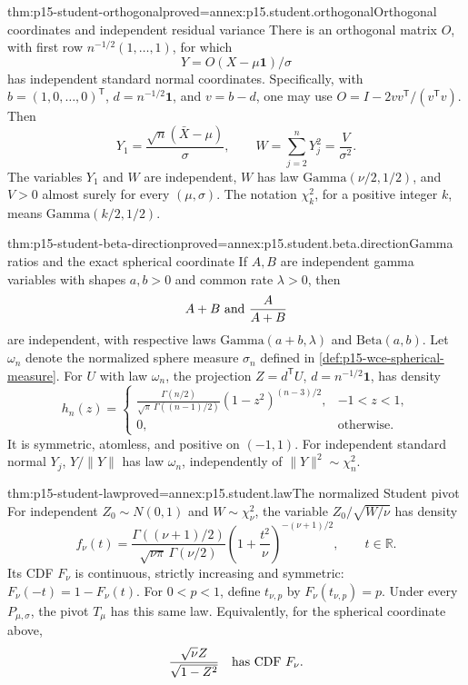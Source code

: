 \begin{hbtheorem}{thm:p15-student-orthogonal}{proved=annex:p15.student.orthogonal}{Orthogonal coordinates and independent residual variance}
There is an orthogonal matrix \(O\), with first row
\(n^{-1/2}(1,\ldots,1)\), for which
\[
 Y=O(X-\mu\mathbf1)/\sigma
\]
has independent standard normal coordinates. Specifically, with
\(b=(1,0,\ldots,0)^{\mathsf T}\),
\(d=n^{-1/2}\mathbf1\), and \(v=b-d\), one may use
\(O=I-2vv^{\mathsf T}/(v^{\mathsf T}v)\).
Then
\[
 Y_1=\frac{\sqrt n(\bar X-\mu)}{\sigma},\qquad
 W=\sum_{j=2}^nY_j^2=\frac V{\sigma^2}.
\]
The variables \(Y_1\) and \(W\) are independent,
\(W\) has law \(\mathrm{Gamma}(\nu/2,1/2)\), and \(V>0\)
almost surely for every \((\mu,\sigma)\).
The notation \(\chi^2_k\), for a positive integer \(k\), means
\(\mathrm{Gamma}(k/2,1/2)\).
\end{hbtheorem}

\begin{hblemma}{thm:p15-student-beta-direction}{proved=annex:p15.student.beta.direction}{Gamma ratios and the exact spherical coordinate}
If \(A,B\) are independent gamma variables with shapes \(a,b>0\)
and common rate \(\lambda>0\), then
\[
 A+B\ \hbox{and}\ \frac A{A+B}
\]
are independent, with respective laws
\(\mathrm{Gamma}(a+b,\lambda)\) and \(\mathrm{Beta}(a,b)\).
Let \(\omega_n\) denote the normalized sphere measure
\(\sigma_n\) defined in \cref{def:p15-wce-spherical-measure}.
For \(U\) with law \(\omega_n\), the projection
\(Z=d^{\mathsf T}U\), \(d=n^{-1/2}\mathbf1\), has density
\[
 h_n(z)=
 \begin{cases}
 \displaystyle
 \frac{\Gamma(n/2)}{\sqrt\pi\,\Gamma((n-1)/2)}
 (1-z^2)^{(n-3)/2},&-1<z<1,\\
 0,&\text{otherwise}.
 \end{cases}
\]
It is symmetric, atomless, and positive on \((-1,1)\).
For independent standard normal \(Y_j\),
\(Y/\|Y\|\) has law \(\omega_n\), independently of
\(\|Y\|^2\sim\chi_n^2\).
\end{hblemma}

\begin{hbtheorem}{thm:p15-student-law}{proved=annex:p15.student.law}{The normalized Student pivot}
For independent \(Z_0\sim N(0,1)\) and \(W\sim\chi_\nu^2\),
the variable \(Z_0/\sqrt{W/\nu}\) has density
\[
 f_\nu(t)=
 \frac{\Gamma((\nu+1)/2)}
      {\sqrt{\nu\pi}\,\Gamma(\nu/2)}
 \left(1+\frac{t^2}{\nu}\right)^{-(\nu+1)/2},
 \qquad t\in\mathbb R.
\]
Its CDF \(F_\nu\) is continuous, strictly increasing and symmetric:
\(F_\nu(-t)=1-F_\nu(t)\). For \(0<p<1\), define
\(t_{\nu,p}\) by \(F_\nu(t_{\nu,p})=p\).
Under every \(P_{\mu,\sigma}\), the pivot \(T_\mu\)
has this same law. Equivalently, for the spherical coordinate above,
\[
        \frac{\sqrt\nu Z}{\sqrt{1-Z^2}}
                \quad\hbox{has CDF }F_\nu.
\]
\end{hbtheorem}

